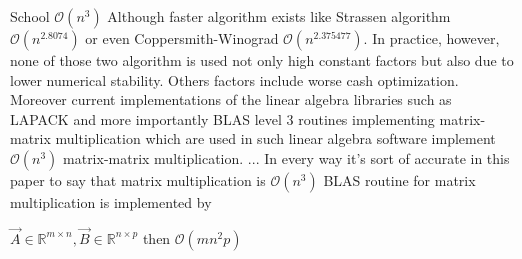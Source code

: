 School  $\mathcal{O}(n^{3})$
Although faster algorithm exists like
Strassen algorithm $\mathcal{O}(n^{2.8074})$ or even
Coppersmith-Winograd $\mathcal {O}(n^{2.375477})$.
In practice, however, none of those two algorithm is used not only high constant factors but also due to lower numerical stability. Others factors include worse cash optimization.
Moreover current implementations of the linear algebra libraries such as LAPACK and more importantly BLAS level 3 routines implementing  matrix-matrix multiplication which are used in such linear algebra software implement $\mathcal{O}(n^{3})$ matrix-matrix multiplication. 
... In every way it's sort of accurate in this paper to say that matrix multiplication is $\mathcal{O}(n^{3})$
BLAS routine for matrix multiplication is implemented by 

$ \vec{A} \in \mathbb{R}^{m \times n}, \vec{B} \in \mathbb{R}^{n\times p}$ then $ \mathcal{O}(mn^{2}p)$